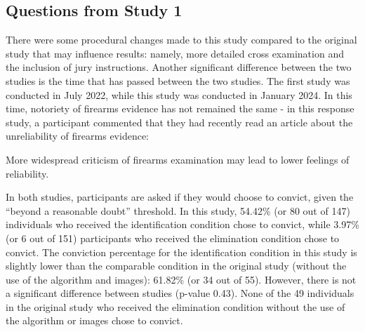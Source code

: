 \documentclass[print]{nuthesis}
\begin{document}
\hypertarget{questions-from-study-1}{%
\subsection{Questions from Study 1}\label{questions-from-study-1}}

There were some procedural changes made to this study compared to the original study that may influence results: namely, more detailed cross examination and the inclusion of jury instructions.
Another significant difference between the two studies is the time that has passed between the two studies.
The first study was conducted in July 2022, while this study was conducted in January 2024.
In this time, notoriety of firearms evidence has not remained the same - in this response study, a participant commented that they had recently read an article about the unreliability of firearms evidence:

\begin{quote}
\end{quote}


More widespread criticism of firearms examination may lead to lower feelings of reliability.

In both studies, participants are asked if they would choose to convict, given the ``beyond a reasonable doubt'' threshold.
In this study, 54.42\% (or 80 out of 147) individuals who received the identification condition chose to convict, while 3.97\% (or 6 out of 151) participants who received the elimination condition chose to convict.
The conviction percentage for the identification condition in this study is slightly lower than the comparable condition in the original study (without the use of the algorithm and images): 61.82\% (or 34 out of 55).
However, there is not a significant difference between studies (p-value 0.43).
None of the 49 individuals in the original study who received the elimination condition without the use of the algorithm or images chose to convict.
\end{document}
